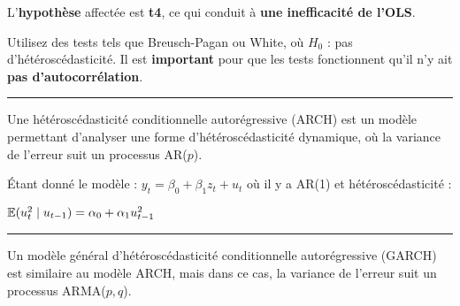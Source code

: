   \begin{f}

L'\textbf{hypothèse} affectée est \textbf{t4}, ce qui conduit à \textbf{une inefficacité de l'OLS}.

Utilisez des tests tels que Breusch-Pagan ou White, où $H_{0}$ : pas d'hétéroscédasticité. Il est \textbf{important} pour que les tests fonctionnent qu'il n'y ait \textbf{pas d'autocorrélation}.

\end{f}  \hrule  
\begin{f}[ARCH]

Une hétéroscédasticité conditionnelle autorégressive (ARCH) est un modèle permettant d'analyser une forme d'hétéroscédasticité dynamique, où la variance de l'erreur suit un processus AR($p$).

Étant donné le modèle : $y_{t} = \beta_{0} + \beta_{1} z_{t} + u_{t}$ où il y a AR(1) et hétéroscédasticité :

\begin{center}
	$\mathbb{E}(u^{2}_{t} \mid u_{t - 1}) = \alpha_{0} + \alpha_{1} u^{2}_{t - 1}$
\end{center}

\end{f}  \hrule 
 \begin{f}[GARCH]

Un modèle général d'hétéroscédasticité conditionnelle autorégressive (GARCH) est similaire au modèle ARCH, mais dans ce cas, la variance de l'erreur suit un processus ARMA($p, q$).
\end{f}